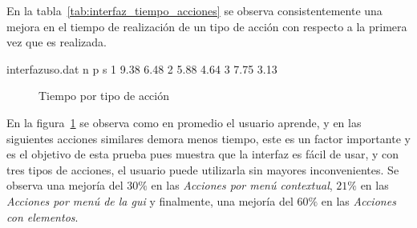 En la tabla~\ref{tab:interfaz_tiempo_acciones} se observa consistentemente una 
mejora en el tiempo de realización de un tipo de acción con respecto a la primera vez 
que es realizada. 

\begin{filecontents}{interfazuso.dat}
n   p       s
1	9.38	6.48
2   5.88	4.64
3   7.75	3.13
\end{filecontents}

\begin{figure}[H]
    
        \centering
        \caption{Tiempo por tipo de acción}
        \label{fig:interfaz_tiempo_acciones}
\end{figure}

En la figura~\ref{fig:interfaz_tiempo_acciones} se observa como en promedio el
usuario aprende, y en las siguientes acciones similares demora menos tiempo,
este es un factor importante y es el objetivo de esta prueba pues muestra que la
interfaz es fácil de usar, y con tres tipos de acciones, el usuario puede
utilizarla sin mayores inconvenientes. Se observa una mejoría del $30\%$ en las
\emph{Acciones por menú contextual}, $21\%$ en las \emph{Acciones por menú de la
    \Gls{gui}} y finalmente, una mejoría del $60\%$ en las \emph{Acciones con elementos}.


